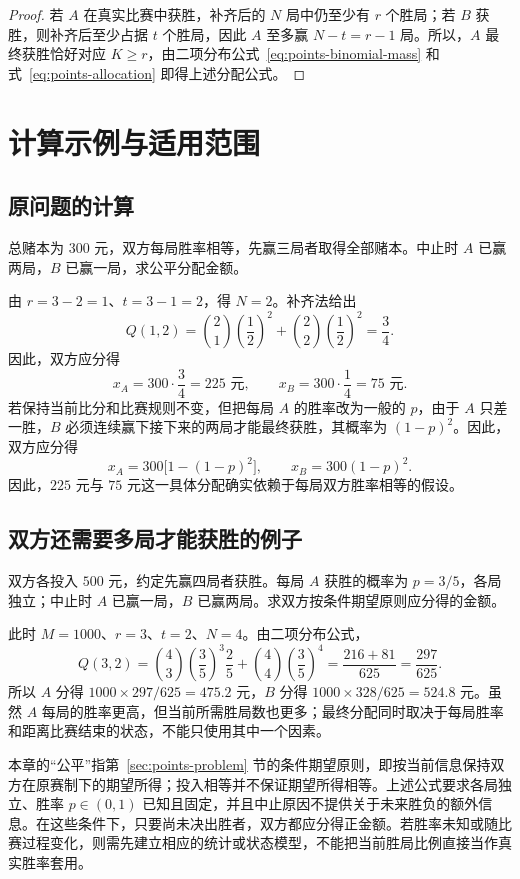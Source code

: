 \documentclass[UTF8]{ctexbook}
\begin{document}
\begin{proof}
若 $A$ 在真实比赛中获胜，补齐后的 $N$ 局中仍至少有 $r$ 个胜局；若 $B$ 获胜，则补齐后至少占据 $t$ 个胜局，因此 $A$ 至多赢 $N-t=r-1$ 局。所以，$A$ 最终获胜恰好对应 $K\ge r$，由二项分布公式~\eqref{eq:points-binomial-mass} 和式~\eqref{eq:points-allocation} 即得上述分配公式。
\end{proof}

\section{计算示例与适用范围}
\label{sec:points-examples}

\subsection{原问题的计算}

\begin{example}
\label{ex:points-original}
总赌本为 $300$ 元，双方每局胜率相等，先赢三局者取得全部赌本。中止时 $A$ 已赢两局，$B$ 已赢一局，求公平分配金额。
\end{example}

\begin{solve}
由 $r=3-2=1$、$t=3-1=2$，得 $N=2$。补齐法给出
\[
  Q(1,2)=\binom21\left(\frac12\right)^2
          +\binom22\left(\frac12\right)^2
        =\frac34.
\]
因此，双方应分得
\[
  x_A=300\cdot\frac34=225\text{ 元},\qquad
  x_B=300\cdot\frac14=75\text{ 元}.
\]
若保持当前比分和比赛规则不变，但把每局 $A$ 的胜率改为一般的 $p$，由于 $A$ 只差一胜，$B$ 必须连续赢下接下来的两局才能最终获胜，其概率为 $(1-p)^2$。因此，双方应分得
\[
  x_A=300\bigl[1-(1-p)^2\bigr],\qquad x_B=300(1-p)^2.
\]
因此，$225$ 元与 $75$ 元这一具体分配确实依赖于每局双方胜率相等的假设。
\end{solve}

\subsection{双方还需要多局才能获胜的例子}

\begin{example}[四胜制下的不等胜率分配]
\label{ex:points-biased}
双方各投入 $500$ 元，约定先赢四局者获胜。每局 $A$ 获胜的概率为 $p=3/5$，各局独立；中止时 $A$ 已赢一局，$B$ 已赢两局。求双方按条件期望原则应分得的金额。
\end{example}

\begin{solve}
此时 $M=1000$、$r=3$、$t=2$、$N=4$。由二项分布公式，
\[
  Q(3,2)=\binom43\left(\frac35\right)^3\frac25
          +\binom44\left(\frac35\right)^4
        =\frac{216+81}{625}=\frac{297}{625}.
\]
所以 $A$ 分得 $1000\times297/625=475.2$ 元，$B$ 分得 $1000\times328/625=524.8$ 元。虽然 $A$ 每局的胜率更高，但当前所需胜局数也更多；最终分配同时取决于每局胜率和距离比赛结束的状态，不能只使用其中一个因素。
\end{solve}

本章的“公平”指第~\ref{sec:points-problem} 节的条件期望原则，即按当前信息保持双方在原赛制下的期望所得；投入相等并不保证期望所得相等。上述公式要求各局独立、胜率 $p\in(0,1)$ 已知且固定，并且中止原因不提供关于未来胜负的额外信息。在这些条件下，只要尚未决出胜者，双方都应分得正金额。若胜率未知或随比赛过程变化，则需先建立相应的统计或状态模型，不能把当前胜局比例直接当作真实胜率套用。
\end{document}
